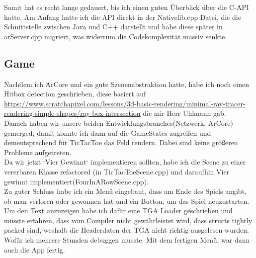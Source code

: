 Somit hat es recht lange gedauert, bis ich einen guten Überblick über die C-API
hatte. Am Anfang hatte ich die API direkt in der Nativelib.cpp Datei, die die
Schnittstelle zwischen Java und C++ darstellt und habe diese später in arServer.cpp
migriert, was widerrum die Codekomplexität massiv senkte.

\subsection{Game}
Nachdem ich ArCore und ein gute Szenenabstraktion hatte, habe ich noch einen Hitbox detection geschrieben, diese basiert auf \url{https://www.scratchapixel.com/lessons/3d-basic-rendering/minimal-ray-tracer-rendering-simple-shapes/ray-box-intersection}
die mir Herr Uhlmann gab.\\

Danach haben wir unsere beiden Entwicklungsbranches(Netzwerk, ArCore) gemerged, damit konnte ich
dann auf die GameStates zugreifen und dementsprechend für TicTacToe das Feld rendern.
Dabei sind keine größeren Probleme aufgetreten. \\

Da wir jetzt `Vier Gewinnt` implementieren sollten, habe ich die Scene zu einer vererbaren Klasse refactored (in TicTacToeScene.cpp) und daraufhin Vier gewinnt implementiert(FourInARowScene.cpp). \\

Zu guter Schluss habe ich ein Menü eingebaut, dass am Ende des Spiels angibt, ob man
verloren oder gewonnen hat und ein Button, um das Spiel neuzustarten.
Um den Text anzuzeigen habe ich dafür eine TGA Loader geschrieben und musste
erfahren, dass vom Compiler nicht gewährleistet wird, dass structs tightly packed
sind, weshalb die Headerdaten der TGA nicht richtig ausgelesen wurden. Wofür ich mehrere Stunden debuggen musste. Mit dem fertigen Menü, war dann auch die App fertig.
